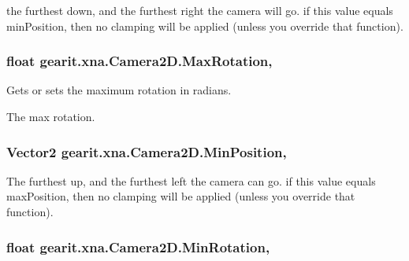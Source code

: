 the furthest down, and the furthest right the camera will go. if this value equals min\+Position, then no clamping will be applied (unless you override that function). 

\hypertarget{classgearit_1_1xna_1_1_camera2_d_a3fad18af294799d0e9d703141494f07d}{
\subsubsection[{Max\+Rotation}]{\setlength{\rightskip}{0pt plus 5cm}float gearit.\+xna.\+Camera2\+D.\+Max\+Rotation\hspace{0.3cm}{\ttfamily [get]}, {\ttfamily [set]}}}\label{classgearit_1_1xna_1_1_camera2_d_a3fad18af294799d0e9d703141494f07d}


Gets or sets the maximum rotation in radians. 

The max rotation.\hypertarget{classgearit_1_1xna_1_1_camera2_d_aef67974a5b726a05b395b372099fcdc9}{
\subsubsection[{Min\+Position}]{\setlength{\rightskip}{0pt plus 5cm}Vector2 gearit.\+xna.\+Camera2\+D.\+Min\+Position\hspace{0.3cm}{\ttfamily [get]}, {\ttfamily [set]}}}\label{classgearit_1_1xna_1_1_camera2_d_aef67974a5b726a05b395b372099fcdc9}


The furthest up, and the furthest left the camera can go. if this value equals max\+Position, then no clamping will be applied (unless you override that function). 

\hypertarget{classgearit_1_1xna_1_1_camera2_d_ab31e75d2cc35168c1ad65431e66cbaf2}{
\subsubsection[{Min\+Rotation}]{\setlength{\rightskip}{0pt plus 5cm}float gearit.\+xna.\+Camera2\+D.\+Min\+Rotation\hspace{0.3cm}{\ttfamily [get]}, {\ttfamily [set]}}}\label{classgearit_1_1xna_1_1_camera2_d_ab31e75d2cc35168c1ad65431e66cbaf2}


